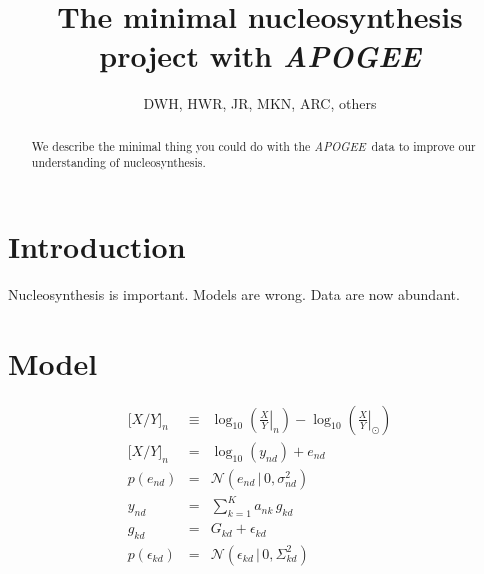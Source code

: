 \documentclass[12pt, preprint]{aastex}
\newcommand{\acronym}[1]{{\small{#1}}}
\newcommand{\project}[1]{\textsl{#1}}
\newcommand{\apogee}{\project{\acronym{APOGEE}}}
\newcommand{\solar}{\odot}
\newcommand{\abundance}[1]{\lbrack{#1}\rbrack}
\newcommand{\given}{\,|\,}
\newcommand{\normal}{\mathcal{N}}
\begin{document}
\title{The minimal nucleosynthesis project with \apogee}
\author{DWH, HWR, JR, MKN, ARC, others}

\begin{abstract}
We describe the minimal thing you could do with the \apogee\ data to
improve our understanding of nucleosynthesis.
\end{abstract}


\section{Introduction}

Nucleosynthesis is important.  Models are wrong.  Data are now abundant.

\section{Model}

\begin{eqnarray}
  \abundance{X/Y}_n &\equiv& \log_{10}\left(\left.\frac{X}{Y}\right|_n\right) -
                             \log_{10}\left(\left.\frac{X}{Y}\right|_\solar\right)
\\
  \abundance{X/Y}_n &=& \log_{10}(y_{nd}) + e_{nd}
\\
  p(e_{nd}) &=& \normal(e_{nd}\given 0,\sigma^2_{nd})
\\
  y_{nd} &=& \sum_{k=1}^K a_{nk}\,g_{kd}
\\
  g_{kd} &=& G_{kd} + \epsilon_{kd}
\\
  p(\epsilon_{kd}) &=& \normal(\epsilon_{kd}\given 0,\Sigma^2_{kd})
\end{eqnarray}
\end{document}
